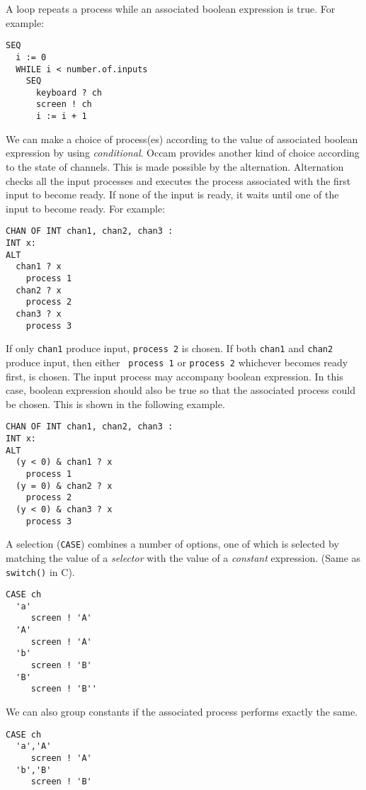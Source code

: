 \par
A loop repeats a process while an associated boolean expression is
true. For example:
\begin{lin}
\begin{verbatim}
SEQ
  i := 0
  WHILE i < number.of.inputs
    SEQ
      keyboard ? ch
      screen ! ch
      i := i + 1
\end{verbatim}
\end{lin}

We can make a choice of process(es) according to the value of
associated boolean expression by using {\em conditional}.  Occam
provides another kind of choice according to the state of channels.
This is made possible by the alternation.  Alternation checks all the
input processes and executes the process associated with the first
input to become ready.  If none of the input is ready, it waits until
one of the input to become ready.  For example:
\begin{lin}
\begin{verbatim}
CHAN OF INT chan1, chan2, chan3 :
INT x:
ALT
  chan1 ? x
    process 1
  chan2 ? x
    process 2
  chan3 ? x
    process 3
\end{verbatim}
\end{lin}
If only {\tt chan1} produce input, {\tt process 2} is chosen.  If
both {\tt chan1} and {\tt chan2} produce input, then either {\tt
process 1} or {\tt process 2} whichever becomes ready first, is  
chosen.  The input process may accompany boolean expression. In this
case,  boolean expression should also be true so that the associated
process could be chosen.  This is shown in the following example.
\begin{lin}
\begin{verbatim}
CHAN OF INT chan1, chan2, chan3 :
INT x:
ALT
  (y < 0) & chan1 ? x
    process 1
  (y = 0) & chan2 ? x
    process 2
  (y < 0) & chan3 ? x
    process 3
\end{verbatim}
\end{lin}
A selection ({\tt CASE}) combines a number of options, one of which is
selected by matching the value of a {\em selector} with the value of a
{\em constant} expression. (Same as {\tt switch()} in C).
\begin{lin}
\begin{verbatim}
CASE ch
  'a'
     screen ! 'A'
  'A'
     screen ! 'A'
  'b'
     screen ! 'B'
  'B'
     screen ! 'B''
\end{verbatim}
\end{lin}
We can also group constants if the associated process performs exactly
the same.
\begin{lin}
\begin{verbatim}
CASE ch
  'a','A'
     screen ! 'A'
  'b','B'
     screen ! 'B'
\end{verbatim}
\end{lin}


